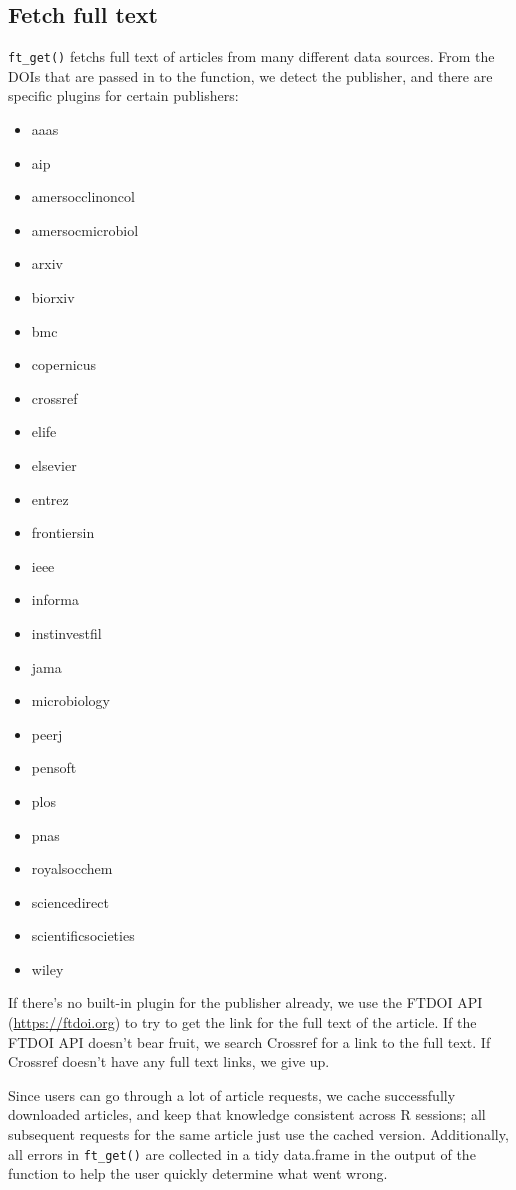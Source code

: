 \documentclass[author-year, review, 11pt]{components/elsarticle} %
\def\tightlist{}
\begin{document}
\hypertarget{fetch-full-text}{%
\subsection{Fetch full text}\label{fetch-full-text}}

\texttt{ft\_get()} fetchs full text of articles from many different data
sources. From the DOIs that are passed in to the function, we detect the
publisher, and there are specific plugins for certain publishers:

\begin{itemize}
\tightlist
\item
  aaas
\item
  aip
\item
  amersocclinoncol
\item
  amersocmicrobiol
\item
  arxiv
\item
  biorxiv
\item
  bmc
\item
  copernicus
\item
  crossref
\item
  elife
\item
  elsevier
\item
  entrez
\item
  frontiersin
\item
  ieee
\item
  informa
\item
  instinvestfil
\item
  jama
\item
  microbiology
\item
  peerj
\item
  pensoft
\item
  plos
\item
  pnas
\item
  royalsocchem
\item
  sciencedirect
\item
  scientificsocieties
\item
  wiley
\end{itemize}

If there's no built-in plugin for the publisher already, we use the
FTDOI API (\url{https://ftdoi.org}) to try to get the link for the full
text of the article. If the FTDOI API doesn't bear fruit, we search
Crossref for a link to the full text. If Crossref doesn't have any full
text links, we give up.

Since users can go through a lot of article requests, we cache
successfully downloaded articles, and keep that knowledge consistent
across R sessions; all subsequent requests for the same article just use
the cached version. Additionally, all errors in \texttt{ft\_get()} are
collected in a tidy data.frame in the output of the function to help the
user quickly determine what went wrong.
\end{document}
